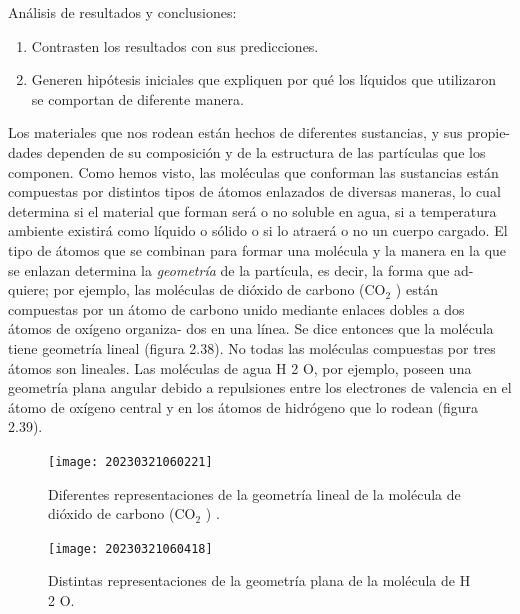 \documentclass[12pt,addpoints,answers]{guia}
\begin{document}
\begin{opening}
\begin{minipage}{0.6\textwidth}
        Análisis de resultados y conclusiones:
        \begin{enumerate}
            \item Contrasten los resultados con sus predicciones.
            \item Generen hipótesis iniciales que expliquen por qué los líquidos que utilizaron se comportan de diferente manera.
        \end{enumerate}
    \end{minipage}
\end{opening}
\begin{multicols}{2}
    
    
\end{multicols}
\begin{tcolorbox}[enhanced,attach boxed title to top center={yshift=-3mm,yshifttext=-1mm},
        colback=blue!5!white,colframe=blue!75!black,colbacktitle=red!80!black,
        title=Geometría molecular,fonttitle=\bfseries,
        boxed title style={size=small,colframe=red!50!black} ]
    Los materiales que nos rodean están hechos de diferentes sustancias, y sus propie-
    dades dependen de su composición y de la estructura de las partículas que los
    componen. Como hemos visto, las moléculas que conforman las sustancias están
    compuestas por distintos tipos de átomos enlazados de diversas maneras, lo cual
    determina si el material que forman será o no soluble en agua, si a temperatura
    ambiente existirá como líquido o sólido o si lo atraerá o no un cuerpo cargado.
    El tipo de átomos que se combinan para formar una molécula y la manera en la
    que se enlazan determina la \emph{geometría} de la partícula, es decir, la forma que ad-
    quiere; por ejemplo, las moléculas de dióxido de carbono (CO$_2$ ) están compuestas por
    un átomo de carbono unido mediante enlaces dobles a dos átomos de oxígeno organiza-
    dos en una línea. Se dice entonces que la molécula tiene geometría lineal (figura 2.38).
    No todas las moléculas compuestas por tres átomos son lineales. Las moléculas
    de agua H 2 O, por ejemplo, poseen una geometría plana angular debido a repulsiones
    entre los electrones de valencia en el átomo de oxígeno central y en los átomos de
    hidrógeno que lo rodean (figura 2.39).
    \begin{figure}[H]
        \texttt{[image: 20230321060221]}
        \caption{Diferentes
            representaciones de
            la geometría lineal
            de la molécula de
            dióxido de carbono
            (CO$_2$ ) .}
        \label{fig:20230321060221}
    \end{figure}
    \begin{figure}[H]
        \texttt{[image: 20230321060418]}
        \caption{Distintas
            representaciones
            de la geometría
            plana de la molécula
            de H 2 O.}
        \label{fig:20230321060418}
    \end{figure}
\end{tcolorbox}
\end{document}
